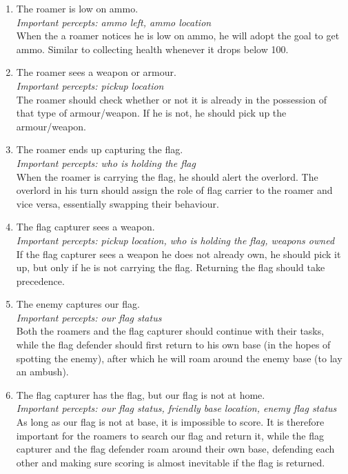 \begin{enumerate}
	\item The roamer is low on ammo. \\
	\textit{Important percepts: ammo left, ammo location} \\
	When the a roamer notices he is low on ammo, he will adopt the goal to get ammo. Similar to collecting health whenever it drops below 100.\\
	\item The roamer sees a weapon or armour. \\
	\textit{Important percepts: pickup location} \\
	The roamer should check whether or not it is already in the possession of that type of armour/weapon. If he is not, he should pick up the armour/weapon.\\
	\item The roamer ends up capturing the flag. \\
	\textit{Important percepts: who is holding the flag} \\
	When the roamer is carrying the flag, he should alert the overlord. The overlord in his turn should assign the role of flag carrier to the roamer and vice versa, essentially swapping their behaviour.\\
	\item The flag capturer sees a weapon. \\
	\textit{Important percepts: pickup location, who is holding the flag, weapons owned} \\
	If the flag capturer sees a weapon he does not already own, he should pick it up, but only if he is not carrying the flag. Returning the flag should take precedence.\\
	\item The enemy captures our flag. \\
	\textit{Important percepts: our flag status} \\
	Both the roamers and the flag capturer should continue with their tasks, while the flag defender should first return to his own base (in the hopes of spotting the enemy), after which he will roam around the enemy base (to lay an ambush). \\
	\item The flag capturer has the flag, but our flag is not at home. \\
	\textit{Important percepts: our flag status, friendly base location, enemy flag status} \\
	As long as our flag is not at base, it is impossible to score. It is therefore important for the roamers to search our flag and return it, while the flag capturer and the flag defender roam around their own base, defending each other and making sure scoring is almost inevitable if the flag is returned. \\
\end{enumerate}